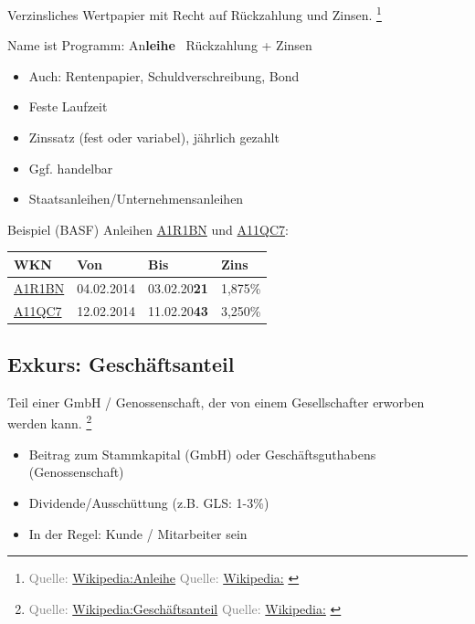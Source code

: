 \documentclass{beamer}
\let\oldfootnote\footnote
\renewcommand{\footnote}[1]
{%
	\oldfootnote
	{
		\tiny
		\textcolor{gray}{#1}
	}%
}
\newcommand{\citewiki}[2][]
{%
	\footnote
	{
		\ifthenelse{\isempty{#1}}
		{
			Quelle: \href{https://de.wikipedia.org/wiki/#2}{Wikipedia:#2}
		}
		{
			Quelle: \href{https://de.wikipedia.org/wiki/#2}{Wikipedia:#1}
		}
	}
}
\newcommand{\wkn}[1]{\href{https://www.finanzen.net/anleihen/#1}{#1}}
\begin{document}
			\begin{frame}
				\begin{definition}
					Verzinsliches Wertpapier mit Recht auf Rückzahlung und Zinsen.\citewiki{Anleihe}
				\end{definition}
				Name ist Programm: An\textbf{leihe} \textrightarrow\ Rückzahlung + Zinsen
				\begin{itemize}
					\item Auch: Rentenpapier, Schuldverschreibung, Bond
					\item Feste Laufzeit
					\item Zinssatz (fest oder variabel), jährlich gezahlt
					\item Ggf. handelbar
					\item Staatsanleihen/Unternehmensanleihen
				\end{itemize}
			\end{frame}
		
			\begin{frame}{Beispiel (BASF)}
				Anleihen \href{https://www.finanzen.net/anleihen/a1r1bn-basf-se-anleihe}{A1R1BN} und \href{https://www.finanzen.net/anleihen/a11qc7-basf-se-anleihe}{A11QC7}:
				\begin{center}
					\begin{tabularx}{8cm}{l|l|l|l}
						WKN				& Von			& Bis					& Zins		\\
						\hline
						\wkn{A1R1BN}	& 04.02.2014	& 03.02.20\textbf{21}	& 1,875\%	\\
						\wkn{A11QC7}	& 12.02.2014	& 11.02.20\textbf{43}	& 3,250\%	\\
					\end{tabularx}
				\end{center}
			\end{frame}
		
		\subsection{Exkurs: Geschäftsanteil}
		
			\begin{frame}
				\begin{definition}
					Teil einer GmbH / Genossenschaft, der von einem Gesellschafter erworben werden kann.\citewiki{Geschäftsanteil}
				\end{definition}
			
				\begin{itemize}
					\item Beitrag zum Stammkapital (GmbH) oder Geschäftsguthabens (Genossenschaft)
					\item Dividende/Ausschüttung (z.B. GLS: 1-3\%)
					\item In der Regel: Kunde / Mitarbeiter sein
				\end{itemize}
			\end{frame}
		
\end{document}
